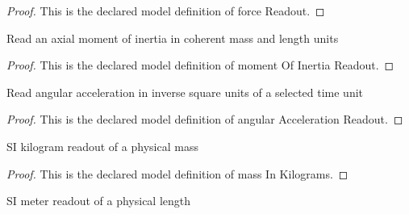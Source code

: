 \begin{proof}
  This is the declared model definition of force Readout.
\end{proof}
\begin{definition}
  \label{def:physics:phyx-mini-0771:phyxminiproblems-problemphyxmini0771-momentofinertiareadout}
  Read an axial moment of inertia in coherent mass and length units
\end{definition}
\begin{proof}
  This is the declared model definition of moment Of Inertia Readout.
\end{proof}
\begin{definition}
  \label{def:physics:phyx-mini-0771:phyxminiproblems-problemphyxmini0771-angularaccelerationreadout}
  Read angular acceleration in inverse square units of a selected time unit
\end{definition}
\begin{proof}
  This is the declared model definition of angular Acceleration Readout.
\end{proof}
\begin{definition}
  \label{def:physics:phyx-mini-0771:phyxminiproblems-problemphyxmini0771-massinkilograms}
  SI kilogram readout of a physical mass
\end{definition}
\begin{proof}
  This is the declared model definition of mass In Kilograms.
\end{proof}
\begin{definition}
  \label{def:physics:phyx-mini-0771:phyxminiproblems-problemphyxmini0771-lengthinmeters}
  SI meter readout of a physical length
\end{definition}
